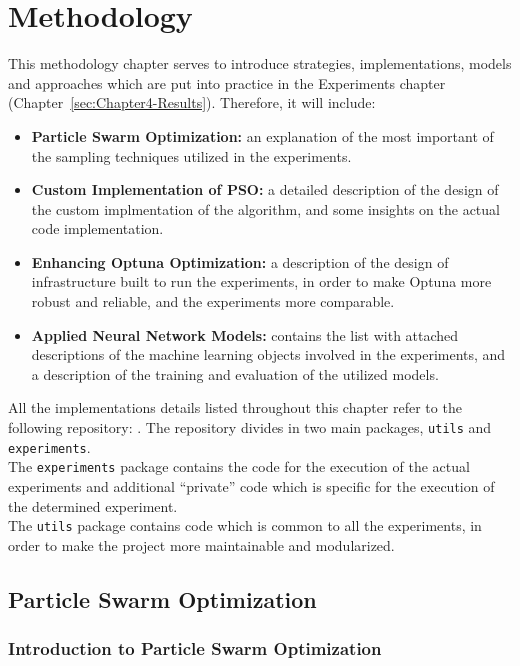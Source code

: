 \chapter{Methodology}\label{sec:Chapter3-Methodology}

This methodology chapter serves to introduce strategies, implementations, models and approaches which are put into practice in the Experiments chapter (Chapter~\ref{sec:Chapter4-Results}). Therefore, it will include:
\begin{itemize}[itemsep=0.1cm]
    \item \textbf{Particle Swarm Optimization:} an explanation of the most important of the sampling techniques utilized in the experiments.
    \item \textbf{Custom Implementation of PSO:} a detailed description of the design of the custom implmentation of the algorithm, and some insights on the actual code implementation.
    \item \textbf{Enhancing Optuna Optimization:} a description of the design of infrastructure built to run the experiments, in order to make Optuna more robust and reliable, and the experiments more comparable.
    \item \textbf{Applied Neural Network Models:} contains the list with attached descriptions of the machine learning objects involved in the experiments, and a description of the training and evaluation of the utilized models.
\end{itemize}

All the implementations details listed throughout this chapter refer to the following repository: \cite{Repository-THESIS}.
The repository divides in two main packages, \texttt{utils} and \texttt{experiments}.
\\[0.3cm]The \texttt{experiments} package contains the code for the execution of the actual experiments and additional “private” code which is specific for the execution of the determined experiment.
\\[0.3cm]The \texttt{utils} package contains code which is common to all the experiments, in order to make the project more maintainable and modularized.

\section{Particle Swarm Optimization}

\subsection{Introduction to Particle Swarm Optimization}

